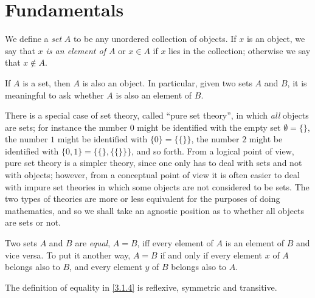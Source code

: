 \section{Fundamentals}\label{sec:3.1}

\begin{defn}\label{3.1.1}
  We define a \emph{set} \(A\) to be any unordered collection of objects.
  If \(x\) is an object, we say that \emph{\(x\) is an element of \(A\)} or \(x \in A\) if \(x\) lies in the collection;
  otherwise we say that \(x \notin A\).
\end{defn}

\begin{ax}\label{3.1}
  If \(A\) is a set, then \(A\) is also an object.
  In particular, given two sets \(A\) and \(B\), it is meaningful to ask whether \(A\) is also an element of \(B\).
\end{ax}

\setcounter{thm}{2}
\begin{rmk}\label{3.1.3}
  There is a special case of set theory, called ``pure set theory'', in which \emph{all} objects are sets;
  for instance the number \(0\) might be identified with the empty set \(\emptyset = \{\}\), the number \(1\) might be identified with \(\{0\} = \{\{\}\}\), the number \(2\) might be identified with \(\{0, 1\} = \{\{\}, \{\{\}\}\}\), and so forth.
  From a logical point of view, pure set theory is a simpler theory, since one only has to deal with sets and not with objects;
  however, from a conceptual point of view it is often easier to deal with impure set theories in which some objects are not considered to be sets.
  The two types of theories are more or less equivalent for the purposes of doing mathematics, and so we shall take an agnostic position as to whether all objects are sets or not.
\end{rmk}

\begin{defn}\label{3.1.4}
  Two sets \(A\) and \(B\) are \emph{equal}, \(A = B\), iff every element of \(A\) is an element of \(B\) and vice versa.
  To put it another way, \(A = B\) if and only if every element \(x\) of \(A\) belongs also to \(B\), and every element \(y\) of \(B\) belongs also to \(A\).
\end{defn}

\begin{ac}\label{ac:3.1.1}
  The definition of equality in \cref{3.1.4} is reflexive, symmetric and transitive.
\end{ac}

